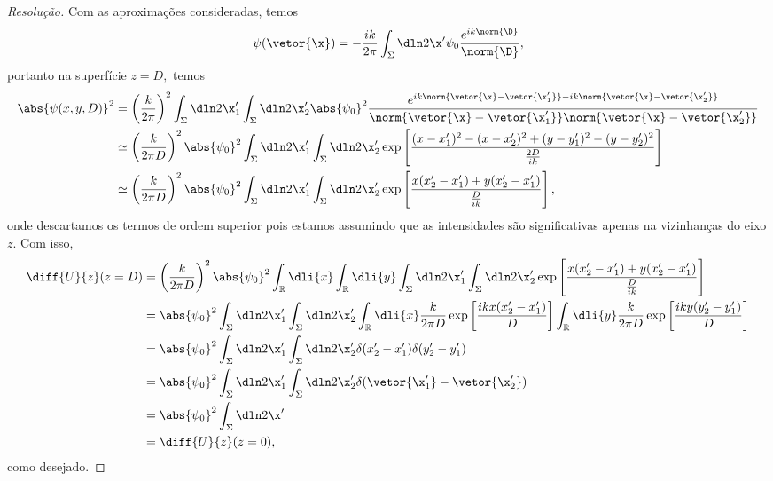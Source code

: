 \begin{proof}[Resolução]
    Com as aproximações consideradas, temos
    \begin{equation*}
        \psi(\vetor{\x}) = -\frac{ik}{2\pi} \int_{\Sigma} \dln2{\x'} \psi_0 \frac{e^{ik \norm{\D}}}{\norm{\D}},
    \end{equation*}
    portanto na superfície \(z = D,\) temos
    \begin{align*}
        \abs{\psi(x,y,D)}^2 &= \left(\frac{k}{2\pi}\right)^2 \int_{\Sigma} \dln2{\x'_1} \int_{\Sigma} \dln2{\x'_2} \abs{\psi_0}^2 \frac{e^{ik\norm{\vetor{\x} - \vetor{\x'_1}} - ik\norm{\vetor{\x} - \vetor{\x'_2}}}}{\norm{\vetor{\x} - \vetor{\x'_1}} \norm{\vetor{\x} - \vetor{\x'_2}}}\\
                            &\simeq \left(\frac{k}{2\pi D}\right)^2 \abs{\psi_0}^2 \int_{\Sigma} \dln2{\x'_1} \int_{\Sigma}\dln2{\x'_2} \exp\left[\frac{(x - x_1')^2 - (x - x_2')^2 + (y - y_1')^2 - (y - y_2')^2}{\frac{2D}{ik}}\right]\\
                            &\simeq \left(\frac{k}{2\pi D}\right)^2 \abs{\psi_0}^2 \int_{\Sigma} \dln2{\x'_1} \int_{\Sigma}\dln2{\x'_2} \exp\left[\frac{x (x_2' - x_1') + y(x_2' - x_1')}{\frac{D}{ik}}\right],
    \end{align*}
    onde descartamos os termos de ordem superior pois estamos assumindo que as intensidades são significativas apenas na vizinhanças do eixo \(z\). Com isso,
    \begin{align*}
        \diff{U}{z}(z = D) &= \left(\frac{k}{2\pi D}\right)^2\abs{\psi_0}^2 \int_{\mathbb{R}} \dli{x} \int_{\mathbb{R}}\dli{y}  \int_{\Sigma} \dln2{\x'_1} \int_{\Sigma}\dln2{\x'_2} \exp\left[\frac{x (x_2' - x_1') + y(x_2' - x_1')}{\frac{D}{ik}}\right]\\
                           &= \abs{\psi_0}^2 \int_{\Sigma} \dln2{\x'_1} \int_{\Sigma}\dln2{\x'_2}\int_{\mathbb{R}} \dli{x}\frac{k}{2\pi D} \exp\left[\frac{ik x(x_2' - x_1')}{D}\right] \int_{\mathbb{R}} \dli{y}\frac{k}{2\pi D} \exp\left[\frac{ik y(y_2' - y_1')}{D}\right]\\
                           &=  \abs{\psi_0}^2 \int_{\Sigma} \dln2{\x_1'} \int_{\Sigma} \dln2{\x_2'} \delta(x'_2 - x'_1) \delta(y_2' - y_1')\\
                           &= \abs{\psi_0}^2 \int_{\Sigma} \dln2{\x_1'} \int_{\Sigma} \dln2{\x_2'} \delta(\vetor{\x_1'} - \vetor{\x_2'})\\
                           &= \abs{\psi_0}^2 \int_{\Sigma} \dln2{\x'}\\
                           &= \diff{U}{z} (z = 0),
    \end{align*}
    como desejado.
\end{proof}
